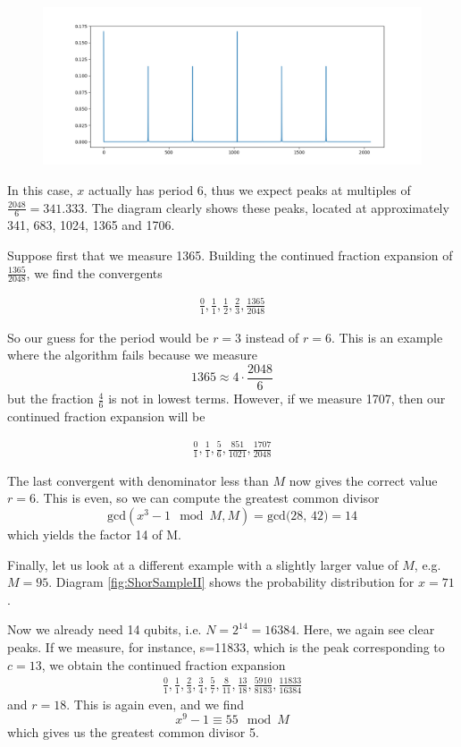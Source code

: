 \documentclass[a4paper, draft]{article}
\theoremstyle{own}
\theoremstyle{remark}
\begin{document}
\begin{figure}[ht]
\centering
\includegraphics[width=1\linewidth]{images/ShorSample}
\caption[Distribution of s]{}
\label{fig:ShorSample}
\end{figure}

In this case, $x$ actually has period 6, thus we expect peaks at multiples of $\frac{2048}{6} = 341.333$. The diagram clearly shows these peaks, located at approximately 341, 683, 1024, 1365 and 1706. 

Suppose first that we measure 1365. Building the continued fraction expansion of $\frac{1365}{2048}$, we find the convergents

\begin{align*}
\frac{0}{1}, \frac{1}{1}, 
\frac{1}{2}, 
\frac{2}{3}, 
\frac{1365}{2048} 
\end{align*}

So our guess for the period would be $r = 3$ instead of $r = 6$. This is an example where the algorithm fails because we measure
$$
1365 \approx 4 \cdot \frac{2048}{6}
$$
but the fraction $\frac{4}{6}$ is not in lowest terms. However, if we measure 1707, then our continued fraction expansion will be

\begin{align*}
\frac{0}{1}, 
\frac{1}{1}, 
\frac{5}{6}, 
\frac{851}{1021}, 
\frac{1707}{2048} 
\end{align*}

The last convergent with denominator less than $M$ now gives the correct value $r=6$. This is even, so we can compute the greatest common divisor 
$$
\text{gcd}(x^3 -1 \mod M, M) = \text{gcd(28, 42)} = 14
$$
which yields the factor 14 of M.

Finally, let us look at a different example with a slightly larger value of $M$, e.g. $M=95$. Diagram \ref{fig:ShorSampleII} shows the probability distribution for $x = 71$.

Now we already need 14 qubits, i.e. $ N = 2^{14} = 16384$. Here, we again see clear peaks. If we measure, for instance, s=11833, which is the peak corresponding to $c = 13$, we obtain the continued fraction expansion
\begin{align*}
\frac{0}{1}, 
\frac{1}{1}, 
\frac{2}{3}, 
\frac{3}{4}, 
\frac{5}{7},
\frac{8}{11},
\frac{13}{18},
\frac{5910}{8183},
\frac{11833}{16384}
\end{align*}
and $r = 18$. This is again even, and we find 
$$
x^9 - 1 \equiv 55 \mod M
$$
which gives us the greatest common divisor 5.
\end{document}

